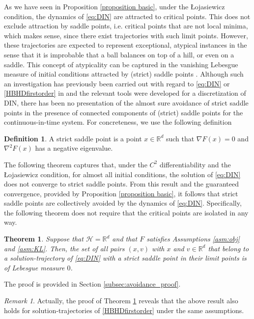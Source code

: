 \documentclass[reqno]{amsart}
\theoremstyle{plain}
\newtheorem{theorem}{Theorem}	%
\theoremstyle{definition}
\newtheorem{definition}{Definition}	%
\theoremstyle{remark}
\newtheorem{remark}{Remark}	%
\begin{document}
As we have seen in Proposition \ref{proposition basic}, under the \L ojasiewicz condition, the dynamics of \eqref{eq:DIN} are attracted to critical points.
This does not exclude attraction by saddle points, i.e. critical points that are not local minima, which makes sense, since there exist trajectories with such limit points. 
However, these trajectories are expected to represent exceptional, atypical instances in the sense that it is improbable that a ball balances on top of a hill, or even on a saddle. 
This concept of atypicality can be captured in the vanishing Lebesgue measure of initial conditions attracted by (strict) saddle points \cite{PdM82}.
Although such an investigation has previously been carried out with regard to \eqref{eq:DIN} or \eqref{HBHDfirstorder} in \cite{castera2023inertial, maulen2024inertial} and the relevant tools were developed for a discretization of DIN, there has been no presentation of the almost sure avoidance of strict saddle points in the presence of connected components of (strict) saddle points for the continuous-in-time system. 
For concreteness, we use the following definition
\begin{definition} 
    A strict saddle point is a point $x\in\mathbb{R}^d$ such that $\nabla F(x) = 0$ and $\nabla^2 F(x)$ has a negative eigenvalue. 
\end{definition}
 
The following theorem captures that, under the $C^{2}$ differentiability and the \L ojasiewicz condition, for almost all initial conditions, the solution of \eqref{eq:DIN} does not converge to strict saddle points. 
From this result and the guaranteed convergence, provided by Proposition \ref{proposition basic}, it follows that strict saddle points are collectively avoided by the dynamics of \eqref{eq:DIN}. 
Specifically, the following theorem does not require that the critical points are isolated in any way. 
\begin{theorem} 
\label{thrm:avoidance_DIN} 
    Suppose that $\mathcal{H}=\mathbb{R}^d$ and that $F$ satisfies Assumptions \ref{asm:obj} and \ref{asm:KL}. 
    Then, the set of all pairs $(x,v)$ with $x$ and $v\in\mathbb{R}^{d}$ that belong to a solution-trajectory of \eqref{eq:DIN} with a strict saddle point in their limit points is of Lebesgue measure $0$. 
\end{theorem} 
The proof is provided in Section \ref{subsec:avoidance_proof}.
\begin{remark}
    Actually, the proof of Theorem \ref{thrm:avoidance_DIN} reveals that the above result also holds for solution-trajectories of \eqref{HBHDfirstorder} under the same assumptions.
\end{remark}
\end{document}
